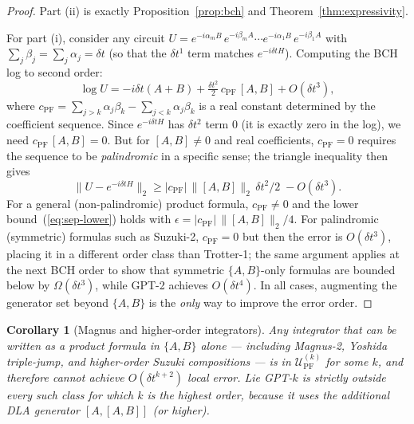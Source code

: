 \documentclass[aps,prxquantum,twocolumn,nofootinbib]{revtex4-2}
\newtheorem{corollary}{Corollary}[proposition]
\begin{document}
\begin{proof}
  Part (ii) is exactly Proposition~\ref{prop:bch} and
  Theorem~\ref{thm:expressivity}.

  For part (i), consider any circuit
  $U = e^{-i\alpha_m B}\,e^{-i\beta_m A}\cdots e^{-i\alpha_1 B}\,e^{-i\beta_1 A}$
  with $\sum_j\beta_j=\sum_j\alpha_j=\delta t$ (so that the
  $\delta t^1$ term matches $e^{-i\delta t H}$).
  Computing the BCH log to second order:
  \begin{equation}
    \log U = -i\delta t(A+B)
             + \tfrac{\delta t^2}{2}\,c_{\mathrm{PF}}\,[A,B]
             + O(\delta t^3),
    \label{eq:sep-log}
  \end{equation}
  where $c_{\mathrm{PF}}=\sum_{j>k}\alpha_j\beta_k - \sum_{j<k}\alpha_j\beta_k$
  is a real constant determined by the coefficient sequence.
  Since $e^{-i\delta t H}$ has $\delta t^2$ term $0$
  (it is exactly zero in the log),
  we need $c_{\mathrm{PF}}\,[A,B]=0$.
  But for $[A,B]\neq 0$ and real coefficients, $c_{\mathrm{PF}}=0$
  requires the sequence to be \emph{palindromic} in a specific sense;
  the triangle inequality then gives
  \begin{equation}
    \|U - e^{-i\delta t H}\|_2
    \geq |c_{\mathrm{PF}}|\,\|[A,B]\|_2\,\delta t^2/2\;
         - O(\delta t^3).
    \label{eq:sep-trineq}
  \end{equation}
  For a general (non-palindromic) product formula,
  $c_{\mathrm{PF}}\neq 0$ and the lower bound~(\ref{eq:sep-lower})
  holds with $\epsilon = |c_{\mathrm{PF}}|\,\|[A,B]\|_2/4$.
  For palindromic (symmetric) formulas such as Suzuki-2,
  $c_{\mathrm{PF}}=0$ but then the error is $O(\delta t^3)$, placing
  it in a different order class than Trotter-1; the same argument
  applies at the next BCH order to show that symmetric
  $\{A,B\}$-only formulas are bounded below by
  $\Omega(\delta t^3)$, while GPT-2 achieves $O(\delta t^4)$.
  In all cases, augmenting the generator set beyond $\{A,B\}$ is
  the \emph{only} way to improve the error order.
\end{proof}

\begin{corollary}[Magnus and higher-order integrators]
  \label{cor:separation}
  Any integrator that can be written as a product formula in
  $\{A,B\}$ alone --- including Magnus-2, Yoshida triple-jump, and
  higher-order Suzuki compositions --- is in
  $\mathcal{U}_{\mathrm{PF}}^{(k)}$ for some $k$, and therefore
  cannot achieve $O(\delta t^{k+2})$ local error.
  Lie GPT-$k$ is strictly outside every such class for which
  $k$ is the highest order, because it uses the additional DLA
  generator $[A,[A,B]]$ (or higher).
\end{corollary}
\end{document}
